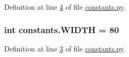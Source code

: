 Definition at line \hyperlink{constants_8py_source_l00004}{4} of file \hyperlink{constants_8py_source}{constants.\+py}.

\hypertarget{namespaceconstants_aa1f49ae50d4547cd3b9f4801d04f5830}{
\subsubsection[{W\+I\+D\+T\+H}]{\setlength{\rightskip}{0pt plus 5cm}int constants.\+W\+I\+D\+T\+H = 80}}\label{namespaceconstants_aa1f49ae50d4547cd3b9f4801d04f5830}


Definition at line \hyperlink{constants_8py_source_l00003}{3} of file \hyperlink{constants_8py_source}{constants.\+py}.

